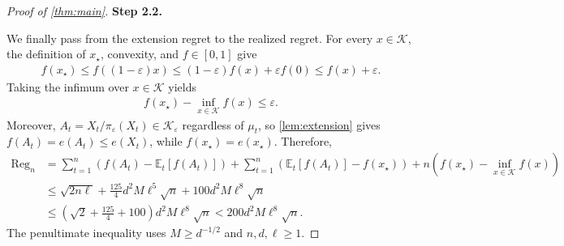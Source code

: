 \documentclass{article}
\newcommand{\proofstepinline}[1]{%
    {\normalfont\normalsize\bfseries\color{blue!55!black}Step #1.}\enspace
}
\newcommand{\E}{\mathbb E}
\newcommand{\K}{\mathcal K}
\newcommand{\1}{\mathbf 1}
\newcommand{\eps}{\varepsilon}
\begin{document}
\begin{proof}[Proof of \cref{thm:main}]
    \proofstepinline{2.2}
    We finally pass from the extension regret to the realized regret.
    For every $x\in\K$, the definition of $x_\star$, convexity, and
    $f\in[0,1]$ give
    \begin{align}
        f(x_\star)
        \leq f((1-\eps)x)
        \leq(1-\eps)f(x)+\eps f(0)
        \leq f(x)+\eps.
    \end{align}
    Taking the infimum over $x\in\K$ yields
    \begin{align}
        f(x_\star)-\inf_{x\in\K}f(x)\leq\eps.
        \label{eq:shrink-comparator}
    \end{align}
    Moreover, $A_t=X_t/\pi_\eps(X_t)\in\K_\eps$ regardless of $\mu_t$,
    so \cref{lem:extension} gives $f(A_t)=e(A_t)\leq e(X_t)$, while
    $f(x_\star)=e(x_\star)$. Therefore,
    \begin{align}
        \operatorname{Reg}_n
         & =\sum_{t=1}^n\left(f(A_t)-\E_t[f(A_t)]\right)
        +\sum_{t=1}^n\left(\E_t[f(A_t)]-f(x_\star)\right)
        +n\left(f(x_\star)-\inf_{x\in\K}f(x)\right)
        \nonumber                                        \\
         & \leq\sqrt{2n\ell}
        +\frac{125}{4}d^2M\ell^5\sqrt n
        +100d^2M\ell^8\sqrt n
        \nonumber                                        \\
         & \leq\left(\sqrt2+\frac{125}{4}+100\right)
        d^2M\ell^8\sqrt n
        <200d^2M\ell^8\sqrt n.
    \end{align}
    The penultimate inequality uses $M\geq d^{-1/2}$ and $n,d,\ell\geq1$.
\end{proof}
\end{document}
